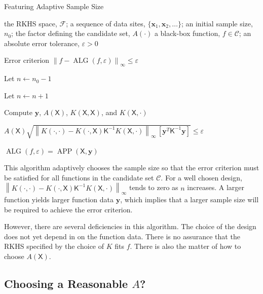 \documentclass[]{mcom-l}
\theoremstyle{remark}
\DeclareMathOperator{\ALG}{ALG}
\DeclareMathOperator{\APP}{APP}
\newcommand{\mK}{\mathsf{K}}
\newcommand{\mX}{\mathsf{X}}
\newcommand{\bx}{{\boldsymbol{x}}}
\newcommand{\by}{{\boldsymbol{y}}}
\newcommand{\cc}{\mathcal{C}}
\newcommand{\calf}{{\mathcal{F}}}
\newcommand{\norm}[2][{}]{\ensuremath{\left \lVert #2 \right \rVert}_{#1}}
\begin{document}
\begin{algorithm}[H]
\caption{Featuring Adaptive Sample Size \label{alg:basicadapt}}
	\begin{algorithmic}
	\PARAM the RKHS space, $\calf$; a sequence of data sites, $\{\bx_1, \bx_2, \ldots \}$; an initial sample size, $n_0$; the factor defining the candidate set, $A(\cdot)$
	\INPUT a black-box function, $f \in \cc$; an absolute error tolerance, $\varepsilon>0$

    \Ensure Error criterion $\norm[\infty]{f - \ALG(f,\varepsilon)} \le \varepsilon$

   \State Let $n \leftarrow n_0 -1$

\Repeat

\State Let $n \leftarrow n + 1$

\State Compute $\by$, $A(\mX)$, $K(\mX,\mX)$, and $K(\mX,\cdot)$

\Until $A(\mX) \sqrt{\norm[\infty]{K(\cdot,\cdot) - K(\cdot,\mX) \mK^{-1} K(\mX,\cdot)} \, [\by^T \mK^{-1} \by] }  \le \varepsilon$

\RETURN $\ALG(f,\varepsilon) = \APP(\mX,\by)$

\end{algorithmic}
\end{algorithm}

This algorithm adaptively chooses the sample size so that the error criterion must be satisfied for all functions in the candidate set $\cc$.  For a well chosen design, $\norm[\infty]{K(\cdot,\cdot) - K(\cdot,\mX) \mK^{-1} K(\mX,\cdot)}$ tends to zero as $n$ increases.  A larger function yields larger function data $\by$, which implies that a larger sample size will be required to achieve the error criterion.

However, there are several deficiencies in this algorithm.  The choice of the design does not yet depend in on the function data.  There is no assurance that the RKHS specified by the choice of $K$ fits $f$.  There is also the matter of how to choose $A(\mX)$.


\subsection{Choosing a Reasonable $A$?}
\end{document}
